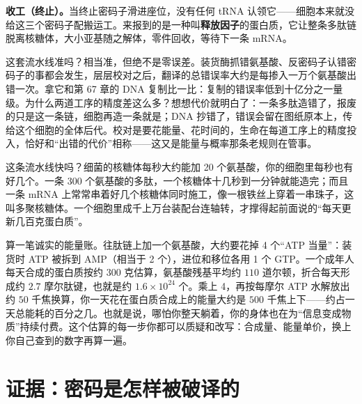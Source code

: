 \textbf{收工（终止）。}当终止密码子滑进座位，没有任何 tRNA 认领它——细胞本来就没给这三个密码子配搬运工。来报到的是一种叫\textbf{释放因子}的蛋白质，它让整条多肽链脱离核糖体，大小亚基随之解体，零件回收，等待下一条 mRNA。

这套流水线准吗？相当准，但绝不是零误差。装货酶抓错氨基酸、反密码子认错密码子的事都会发生，层层校对之后，翻译的总错误率大约是每掺入一万个氨基酸出错一次。拿它和第 67 章的 DNA 复制比一比：复制的错误率低到十亿分之一量级。为什么两道工序的精度差这么多？想想代价就明白了：一条多肽造错了，报废的只是这一条链，细胞再造一条就是；DNA 抄错了，错误会留在图纸原本上，传给这个细胞的全体后代。校对是要花能量、花时间的，生命在每道工序上的精度投入，恰好和“出错的代价”相称——这又是能量与概率那条老规则在管事。

这条流水线快吗？细菌的核糖体每秒大约能加 20 个氨基酸，你的细胞里每秒也有好几个。一条 300 个氨基酸的多肽，一个核糖体十几秒到一分钟就能造完；而且一条 mRNA 上常常串着好几个核糖体同时施工，像一根铁丝上穿着一串珠子，这叫多聚核糖体。一个细胞里成千上万台装配台连轴转，才撑得起前面说的“每天更新几百克蛋白质”。

\begin{qiaoliang}
算一笔诚实的能量账。往肽链上加一个氨基酸，大约要花掉 4 个“ATP 当量”：装货时 ATP 被拆到 AMP（相当于 2 个），进位和移位各用 1 个 GTP。一个成年人每天合成的蛋白质按约 $300$ 克估算，氨基酸残基平均约 $110$ 道尔顿，折合每天形成约 $2.7$ 摩尔肽键，也就是约 $1.6\times 10^{24}$ 个。乘上 4，再按每摩尔 ATP 水解放出约 $50$ 千焦换算，你一天花在蛋白质合成上的能量大约是 $500$ 千焦上下——约占一天总能耗的百分之几。也就是说，哪怕你整天躺着，你的身体也在为“信息变成物质”持续付费。这个估算的每一步你都可以质疑和改写：合成量、能量单价，换上你自己查到的数字再算一遍。
\end{qiaoliang}

\section{证据：密码是怎样被破译的}

